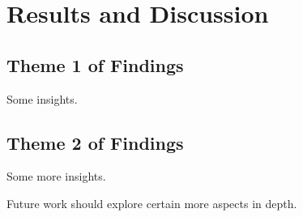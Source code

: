 \section{Results and Discussion}

\subsection{Theme 1 of Findings}

Some insights. 

\subsection{Theme 2 of Findings}

Some more insights. 

Future work should explore certain more aspects in depth. 

\newpage